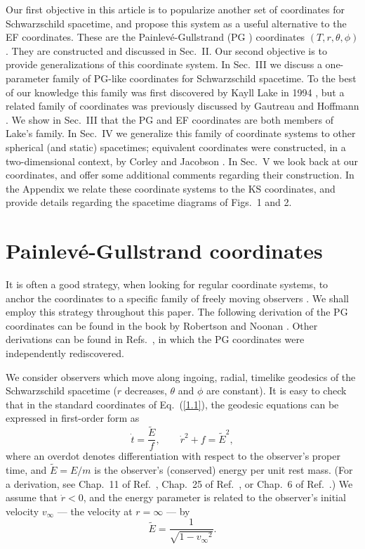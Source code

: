 Our first objective in this article is to popularize another set of
coordinates for Schwarzschild spacetime, and propose this system as a
useful alternative to the EF coordinates. These are the
Painlev\'e-Gullstrand (PG \cite{Painleve,Gullstrand}) coordinates
$(T,r,\theta,\phi)$. They are constructed and discussed in
Sec.~II. Our second objective is to provide generalizations of this 
coordinate system. In Sec.~III we discuss a one-parameter family of
PG-like coordinates for Schwarzschild spacetime. To the best of our
knowledge this family was first discovered by Kayll Lake 
in 1994 \cite{Lake}, but a related family of coordinates was
previously discussed by Gautreau and Hoffmann
\cite{GH,Gautreau,f0}. We show in Sec.~III that the PG and EF
coordinates are both members of Lake's family. In Sec.~IV we
generalize this family of coordinate systems to other spherical (and
static) spacetimes; equivalent coordinates were constructed, in a
two-dimensional context, by Corley and Jacobson \cite{f1}. In Sec.~V
we look back at our coordinates, and offer some additional comments
regarding their construction. In the Appendix we relate these
coordinate systems to the KS coordinates, and provide details
regarding the spacetime diagrams of Figs.~1 and 2.          

\section{Painlev\'e-Gullstrand coordinates} 

It is often a good strategy, when looking for regular coordinate
systems, to anchor the coordinates to a specific family of freely 
moving observers \cite{Novikov}. We shall employ this strategy
throughout this paper. The following derivation of the PG coordinates
can be found in the book by Robertson and Noonan
\cite{Robertson}. Other derivations can be found in
Refs.~\cite{GH,Gautreau,KW}, in which the PG coordinates were 
independently rediscovered.  

We consider observers which move along ingoing, radial, timelike
geodesics of the Schwarzschild spacetime ($r$ decreases, $\theta$ and
$\phi$ are constant). It is easy to check that in the standard
coordinates of Eq.~(\ref{1.1}), the geodesic equations can be
expressed in first-order form as 
\begin{equation}
\dot{t} = \frac{\tilde{E}}{f}, \qquad
\dot{r}^2 + f = \tilde{E}^2, 
\label{2.1}
\end{equation}
where an overdot denotes differentiation with respect to the
observer's proper time, and $\tilde{E} = E/m$ is the observer's
(conserved) energy per unit rest mass. (For a derivation, see Chap.~11
of Ref.~\cite{Schutz}, Chap.~25 of Ref.~\cite{MTW}, or Chap.~6 of
Ref.~\cite{Wald}.) We assume that $\dot{r} < 0$, and the energy
parameter is related to the observer's initial velocity $v_\infty$ ---
the velocity at $r = \infty$ --- by  
\begin{equation}
\tilde{E} = \frac{1}{\sqrt{1-{v_\infty}^2}}. 
\label{2.2}
\end{equation} 

